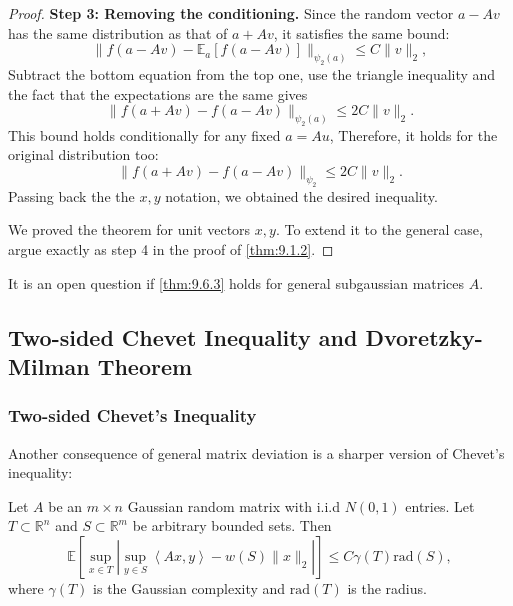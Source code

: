 \begin{proof}
\textbf{Step 3: Removing the conditioning.} Since the random vector $a - Av$ has the same distribution as that 
of $a + Av$, it satisfies the same bound:
\[ \lVert f(a - Av) - \mathbb{E}_a\left[ f(a - Av) \right] \rVert_{\psi_2(a)} \leq C \lVert v \rVert_{2}, \]
Subtract the bottom equation from the top one, use the triangle inequality and the fact that the expectations 
are the same gives 
\[ \lVert f(a + Av) - f(a - Av) \rVert_{\psi_2(a)} \leq 2 C \lVert v \rVert_{2}. \]
This bound holds conditionally for any fixed $a = Au$, Therefore, it holds for the original distribution too:
\[ \lVert f(a + Av) - f(a - Av) \rVert_{\psi_2} \leq 2 C \lVert v \rVert_{2}. \]
Passing back the the $x, y$ notation, we obtained the desired inequality.

We proved the theorem for unit vectors $x, y$. To extend it to the general case, argue exactly as step 4 in the 
proof of \cref{thm:9.1.2}.
\end{proof}

\begin{remark}[]
\label{rmk:9.6.5}
It is an open question if \cref{thm:9.6.3} holds for general subgaussian matrices $A$.
\end{remark}



\subsection{Two-sided Chevet Inequality and Dvoretzky-Milman Theorem}


\subsubsection{Two-sided Chevet's Inequality}
Another consequence of general matrix deviation is a sharper version of Chevet's inequality:

\begin{theorem}
\label{thm:9.7.1}
Let $A$ be an $m \times n$ Gaussian random matrix with i.i.d $N(0, 1)$ entries. Let $T \subset \mathbb{R}^n$ and 
$S \subset \mathbb{R}^m$ be arbitrary bounded sets. Then 
\[ \mathbb{E}\left[ \sup_{x \in T} \left| \sup_{y \in S}\left\langle Ax, y \right\rangle - w(S) \lVert x 
\rVert_{2} \right| \right] \leq C \gamma(T) \mathrm{rad}(S), \]
where $\gamma(T)$ is the Gaussian complexity and $\mathrm{rad}(T)$ is the radius.
\end{theorem}

